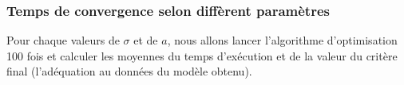 \documentclass{article}
\begin{document}
\subsubsection{Temps de convergence selon diffèrent paramètres}
Pour chaque valeurs de $\sigma$ et de $a$, nous allons lancer l'algorithme d'optimisation 100 fois et calculer les moyennes du temps d'exécution et de la valeur du critère final (l'adéquation au données du modèle obtenu).
 
\begin{figure}[h]
	\center

\end{figure}
\end{document}
